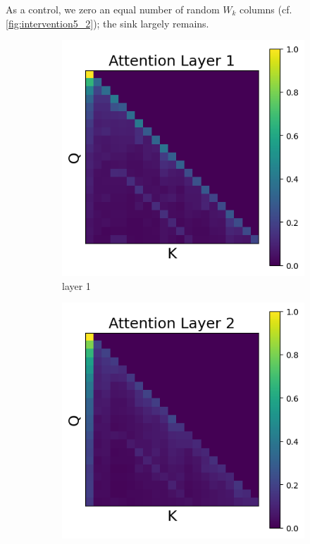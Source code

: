 \documentclass[11pt]{article}
\begin{document}
As a control, we zero an equal number of random $W_k$ columns (cf. \cref{fig:intervention5_2}); the sink largely remains.
\begin{figure}[t]
  \begin{subfigure}[t]{0.24\textwidth}
    \centering
    \includegraphics[width=1.4\columnwidth]{figures/intervention5_2/layer_1.png}
    \caption{layer 1}
  \end{subfigure}\hfill
  \begin{subfigure}[t]{0.24\textwidth}
    \centering
    \includegraphics[width=1.4\columnwidth]{figures/intervention5_2/layer_2.png}

\end{subfigure}
\end{figure}
\end{document}
